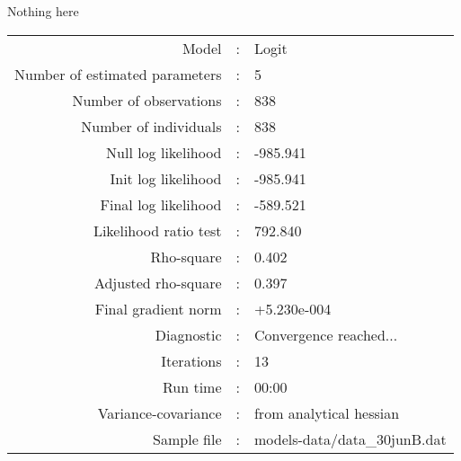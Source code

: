 Nothing here\\


\begin{flushleft}
\begin{tabular}{rcl}
\hline
Model &:& Logit\\
Number of estimated parameters&:&5\\
Number of  observations &:& 838\\
Number of individuals&:&838\\
Null log likelihood&:&-985.941\\
Init log likelihood&:&-985.941\\
Final log likelihood&:&-589.521\\
Likelihood ratio test &:&792.840\\
Rho-square&:&0.402\\
Adjusted rho-square&:&0.397\\
Final gradient norm&:&+5.230e-004\\
Diagnostic&:&Convergence reached...\\
Iterations&:&13\\
Run time&:&00:00\\
Variance-covariance&:&from analytical hessian
\\
Sample file&:&models-data/data_30junB.dat\\
\end{tabular}
\end{flushleft}
